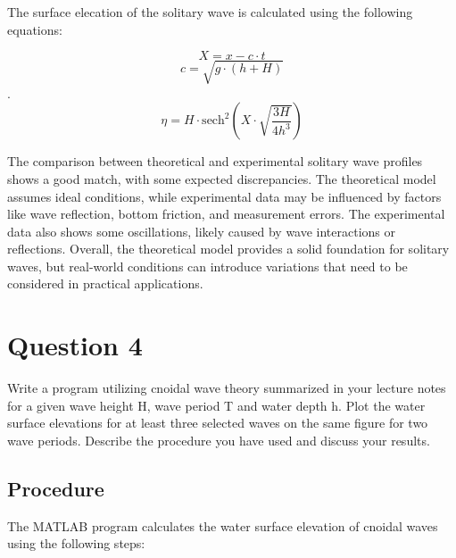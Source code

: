\documentclass[a4paper]{article}
\begin{document}
The surface elecation of the solitary wave is calculated using the following equations:

\[X = x - c \cdot t\] 
\[c = \sqrt{g \cdot (h+H)}\]. 
\[\eta = H \cdot \text{sech}^2\left(X \cdot \sqrt{\frac{3H}{4h^3}}\right)\]

The comparison between theoretical and experimental solitary wave profiles shows a good match, with some expected discrepancies. The theoretical model assumes ideal conditions, while experimental data may be influenced by factors like wave reflection, bottom friction, and measurement errors. The experimental data also shows some oscillations, likely caused by wave interactions or reflections. Overall, the theoretical model provides a solid foundation for solitary waves, but real-world conditions can introduce variations that need to be considered in practical applications.
\vspace{0.5cm}

\section{Question 4} Write a program utilizing cnoidal wave theory summarized in your lecture notes for a given wave height H, wave period T and water depth h. Plot the water surface elevations for at least three selected waves on the same figure for two wave periods. Describe the procedure you have used and discuss your results.

\subsection*{Procedure}
The MATLAB program calculates the water surface elevation of cnoidal waves using the following steps:
\end{document}
